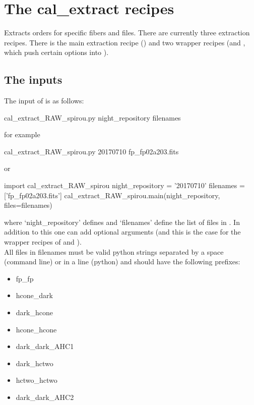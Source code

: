 \clearpage
\newpage
\section{The cal\_extract recipes}
\label{ch:the_recipes:cal_extract_RAW_spirou}

Extracts orders for specific fibers and files. There are currently three extraction recipes. There is the main extraction recipe (\calextractRAW) and two wrapper recipes (\calextractRAWAB and \calextractRAWC, which push certain options into \calextractRAW).

\subsection{The inputs}
The input of \calextractRAW is as follows:
\begin{cmdbox}
cal_extract_RAW_spirou.py night_repository filenames
\end{cmdbox}
\noindent for example
\begin{cmdbox}[title={example}]
cal_extract_RAW_spirou.py 20170710 fp_fp02a203.fits
\end{cmdbox}
\noindent or
\begin{pythonbox}
import cal_extract_RAW_spirou
night_repository = '20170710'
filenames = ['fp_fp02a203.fits']
cal_extract_RAW_spirou.main(night_repository, files=filenames)
\end{pythonbox}

\noindent where `night\_repository' defines \argnightname and `filenames' define the list of files in \argfilenames. In addition to this one can add optional arguments (and this is the case for the wrapper recipes of \calextractRAWAB and \calextractRAWC). \\

\noindent All files in filenames must be valid python strings separated by a space (command line) or in a line (python) and should have the following prefixes:
\begin{itemize}
	\item fp\_fp
	\item hcone\_dark
	\item dark\_hcone
	\item hcone\_hcone
	\item dark\_dark\_AHC1
	\item dark\_hctwo
	\item hctwo\_hctwo
	\item dark\_dark\_AHC2
\end{itemize}

